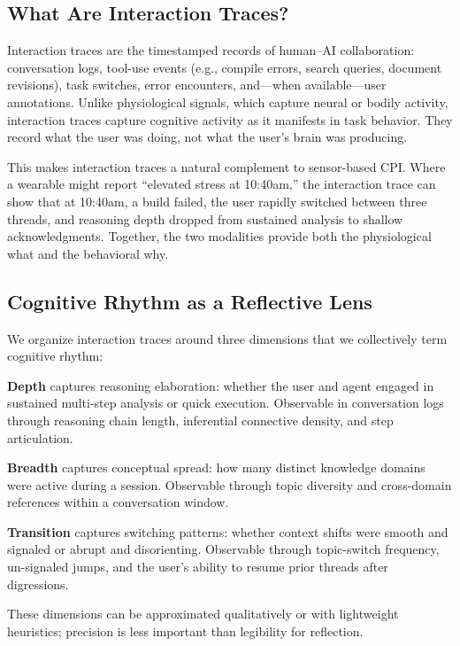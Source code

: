 \documentclass[10pt]{article}
\begin{document}
\subsection{What Are Interaction Traces?}

Interaction traces are the timestamped records of human--AI collaboration: conversation logs, tool-use events (e.g., compile errors, search queries, document revisions), task switches, error encounters, and---when available---user annotations. Unlike physiological signals, which capture neural or bodily activity, interaction traces capture cognitive activity as it manifests in task behavior. They record what the user was doing, not what the user's brain was producing.

This makes interaction traces a natural complement to sensor-based CPI. Where a wearable might report ``elevated stress at 10:40am,'' the interaction trace can show that at 10:40am, a build failed, the user rapidly switched between three threads, and reasoning depth dropped from sustained analysis to shallow acknowledgments. Together, the two modalities provide both the physiological what and the behavioral why.

\subsection{Cognitive Rhythm as a Reflective Lens}

We organize interaction traces around three dimensions that we collectively term cognitive rhythm:

\textbf{Depth} captures reasoning elaboration: whether the user and agent engaged in sustained multi-step analysis or quick execution. Observable in conversation logs through reasoning chain length, inferential connective density, and step articulation.

\textbf{Breadth} captures conceptual spread: how many distinct knowledge domains were active during a session. Observable through topic diversity and cross-domain references within a conversation window.

\textbf{Transition} captures switching patterns: whether context shifts were smooth and signaled or abrupt and disorienting. Observable through topic-switch frequency, un-signaled jumps, and the user's ability to resume prior threads after digressions.

These dimensions can be approximated qualitatively or with lightweight heuristics; precision is less important than legibility for reflection.
\end{document}

